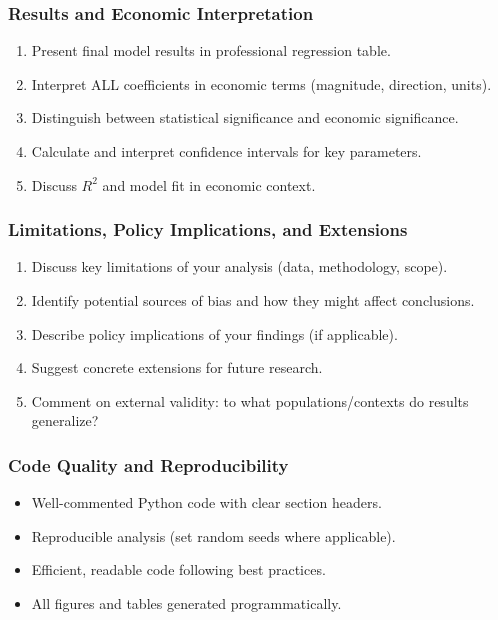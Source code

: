 \subsubsection{Results and Economic Interpretation}
\begin{enumerate}
    \item Present final model results in professional regression table.
    \item Interpret ALL coefficients in economic terms (magnitude, direction, units).
    \item Distinguish between statistical significance and economic significance.
    \item Calculate and interpret confidence intervals for key parameters.
    \item Discuss $R^2$ and model fit in economic context.
\end{enumerate}

\subsubsection{Limitations, Policy Implications, and Extensions}
\begin{enumerate}
    \item Discuss key limitations of your analysis (data, methodology, scope).
    \item Identify potential sources of bias and how they might affect conclusions.
    \item Describe policy implications of your findings (if applicable).
    \item Suggest concrete extensions for future research.
    \item Comment on external validity: to what populations/contexts do results generalize?
\end{enumerate}

\subsubsection{Code Quality and Reproducibility}
\begin{itemize}
    \item Well-commented Python code with clear section headers.
    \item Reproducible analysis (set random seeds where applicable).
    \item Efficient, readable code following best practices.
    \item All figures and tables generated programmatically.
\end{itemize}

\endgroup
